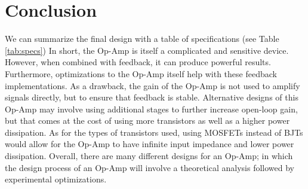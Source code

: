 \documentclass[lettersize,journal]{IEEEtran}
\begin{document}
\section{Conclusion}
We can summarize the final design with a table of specifications (see Table \ref{tab:specs})
In short, the Op-Amp is itself a complicated and sensitive device. However, when 
combined with feedback, it can produce powerful results. Furthermore, optimizations 
to the Op-Amp itself help with these feedback implementations. As a drawback, the 
gain of the Op-Amp is not used to amplify signals directly, but to ensure that 
feedback is stable. Alternative designs of this Op-Amp may involve using additional 
stages to further increase open-loop gain, but that comes at the cost of using 
more transistors as well as a higher power dissipation. As for the types of 
transistors used, using MOSFETs instead of BJTs would allow for the Op-Amp to 
have infinite input impedance and lower power dissipation. Overall, there are 
many different designs for an Op-Amp; in which the design process of an Op-Amp 
will involve a theoretical analysis followed by experimental optimizations.
\begin{table*}[!t]
  \centering
  \caption{Op-Amp Specifications}
  \label{tab:specs}
\end{table*}
\end{document}
